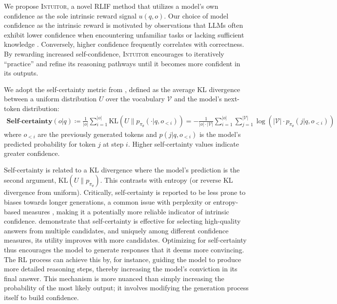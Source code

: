 \documentclass{article} %
\newcommand{\methodname}{\textsc{Intuitor}\xspace}
\begin{document}
We propose \methodname, a novel RLIF method that utilizes a model's own confidence as the sole intrinsic reward signal $u(q,o)$. Our choice of model confidence as the intrinsic reward is motivated by observations that LLMs often exhibit lower confidence when encountering unfamiliar tasks or lacking sufficient knowledge \citep{kang2024unfamiliar}. Conversely, higher confidence frequently correlates with correctness. By rewarding increased self-confidence, \methodname encourages to iteratively ``practice'' and refine its reasoning pathways until it becomes more confident in its outputs.

We adopt the self-certainty metric from \citet{kang2025scalable}, defined as the average KL divergence between a uniform distribution $U$ over the vocabulary $\mathcal{V}$ and the model's next-token distribution:
\begin{align}
\textbf{Self-certainty}(o|q)  \coloneqq \frac{1}{|o|}\sum_{i=1}^{|o|} \mathrm{KL}(U\parallel p_{\pi_\theta}(\cdot|q,o_{<i}))  = -\frac{1}{|o|\cdot|\mathcal{V}|}\sum_{i=1}^{|o|}\sum_{j=1}^{|\mathcal{V}|} \log\left(|\mathcal{V}|\cdot p_{\pi_\theta}(j|q,o_{<i})\right) \label{eq:self_certainty}
\end{align}
where $o_{<i}$ are the previously generated tokens and $p(j|q,o_{<i})$ is the model's predicted probability for token $j$ at step $i$. Higher self-certainty values indicate greater confidence. 


Self-certainty is related to a KL divergence where the model's prediction is the second argument, $\mathrm{KL}(U\parallel p_{\pi_\theta})$. This contrasts with entropy (or reverse KL divergence from uniform).
Critically, self-certainty is reported to be less prone to biases towards longer generations, a common issue with perplexity or entropy-based measures \citep{fang2024wrong, kang2025scalable}, making it a potentially more reliable indicator of intrinsic confidence. \citet{kang2025scalable} demonstrate that self-certainty is effective for selecting high-quality answers from multiple candidates, and uniquely among different confidence measures, its utility improves with more candidates. Optimizing for self-certainty thus encourages the model to generate responses that it deems more convincing. The RL process can achieve this by, for instance, guiding the model to produce more detailed reasoning steps, thereby increasing the model's conviction in its final answer. This mechanism is more nuanced than simply increasing the probability of the most likely output; it involves modifying the generation process itself to build confidence.
\end{document}
